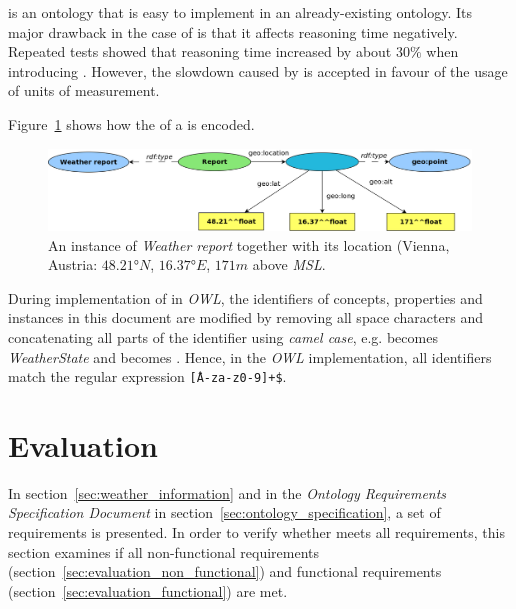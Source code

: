 \muo is an ontology that is easy to implement in an already-existing ontology. Its major drawback in the case of \thinkhomeweather is that it affects reasoning time negatively. Repeated tests showed that reasoning time increased by about $30 \%$ when introducing \muo. However, the slowdown caused by \muo is accepted in favour of the usage of units of measurement.

\vspace{1em}

Figure~\ref{fig:owl_wgs84} shows how the  of a  is encoded.

\begin{figure}
  \includegraphics[width=\textwidth]{figures/diagrams/wgs84.png}
  \caption{An instance of \emph{Weather report} together with its location (Vienna, Austria: $48.21 \si{\degree} N$, $16.37 \si{\degree} E$, $171 m$ above \emph{MSL}.}
  \label{fig:owl_wgs84}
\end{figure}

During implementation of \thinkhomeweather in \emph{OWL}, the identifiers of concepts, properties and instances in this document are modified by removing all space characters and concatenating all parts of the identifier using \emph{camel case}\cite{CamelCase}, e.g.  becomes \emph{WeatherState} and  becomes . Hence, in the \emph{OWL} implementation, all identifiers match the regular expression \texttt{\^[A-za-z0-9]+\$}.



\section{Evaluation}
\label{sec:ontology_evaluation}

In section~\ref{sec:weather_information} and in the \emph{Ontology Requirements Specification Document} in section~\ref{sec:ontology_specification}, a set of requirements is presented. In order to verify whether \thinkhomeweather meets all requirements, this section examines if all non-functional requirements (section~\ref{sec:evaluation_non_functional}) and functional requirements (section~\ref{sec:evaluation_functional}) are met.

